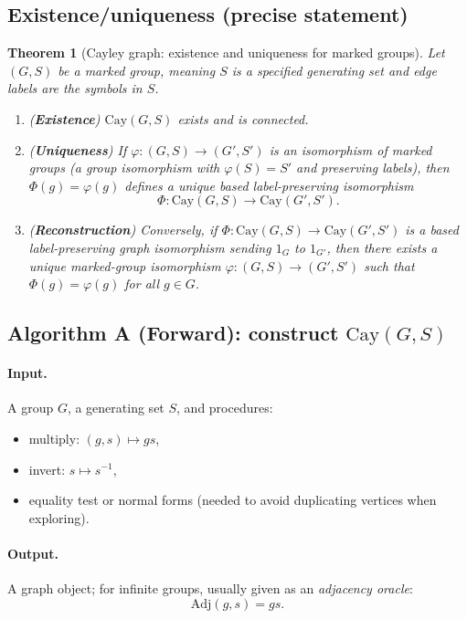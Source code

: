 \documentclass[11pt]{article}
\newtheorem{theorem}{Theorem}[section]
\theoremstyle{definition}
\theoremstyle{plain}
\theoremstyle{remark}
\newcommand{\Cay}{\mathrm{Cay}}
\begin{document}
\subsection*{Existence/uniqueness (precise statement)}
\begin{theorem}[Cayley graph: existence and uniqueness for marked groups]\label{thm:cayley-unique}
Let $(G,S)$ be a \emph{marked group}, meaning $S$ is a specified generating set and edge labels are the symbols in $S$.
\begin{enumerate}[leftmargin=2.2em]
\item (\textbf{Existence}) $\Cay(G,S)$ exists and is connected.

\item (\textbf{Uniqueness}) If $\varphi:(G,S)\to (G',S')$ is an isomorphism of marked groups (a group isomorphism with $\varphi(S)=S'$ and preserving labels),
then $\Phi(g)=\varphi(g)$ defines a unique based label-preserving isomorphism
\[
\Phi:\Cay(G,S)\longrightarrow \Cay(G',S').
\]

\item (\textbf{Reconstruction}) Conversely, if $\Phi:\Cay(G,S)\to \Cay(G',S')$ is a based label-preserving graph isomorphism sending $1_G$ to $1_{G'}$,
then there exists a unique marked-group isomorphism $\varphi:(G,S)\to(G',S')$ such that $\Phi(g)=\varphi(g)$ for all $g\in G$.
\end{enumerate}
\end{theorem}

\subsection*{Algorithm A (Forward): construct $\Cay(G,S)$}\cite{cayley1878,cormen2009}
\paragraph{Input.}
A group $G$, a generating set $S$, and procedures:
\begin{itemize}[leftmargin=2em]
\item multiply: $(g,s)\mapsto gs$,
\item invert: $s\mapsto s^{-1}$,
\item equality test or normal forms (needed to avoid duplicating vertices when exploring).
\end{itemize}

\paragraph{Output.}
A graph object; for infinite groups, usually given as an \emph{adjacency oracle}:
\[
\text{Adj}(g,s)=gs.
\]
\end{document}
